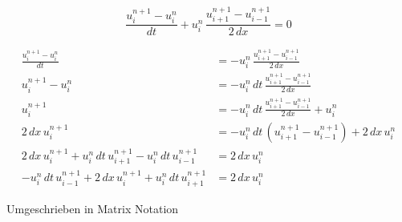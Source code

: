 \begin{equation}
    \frac{u_{i}^{n+1}-u_{i}^{n}}{dt} + u_{i}^{n} \, \frac{u_{i+1}^{n+1} - u_{i-1}^{n+1}}{2 \, dx} = 0
\end{equation}

\begin{subequations}
  \begin{align}
  \frac{u_{i}^{n+1}-u_{i}^{n}}{dt} &= -u_{i}^{n} \, \frac{u_{i+1}^{n+1} - u_{i-1}^{n+1}}{2 \, dx} \\
    u_{i}^{n+1}-u_{i}^{n} &= -u_{i}^{n} \, dt \, \frac{u_{i+1}^{n+1} - u_{i-1}^{n+1}}{2 \, dx}\\
    u_{i}^{n+1} &= -u_{i}^{n} \, dt \, \frac{u_{i+1}^{n+1} - u_{i-1}^{n+1}}{2 \, dx} + u_{i}^{n}\\
    2 \, dx \,  u_{i}^{n+1} &= -u_{i}^{n} \, dt \, \left(u_{i+1}^{n+1} - u_{i-1}^{n+1} \right) + 2 \, dx \, u_{i}^{n}\\
    2 \, dx \,  u_{i}^{n+1} + u_{i}^{n} \, dt \, u_{i+1}^{n+1} -u_{i}^{n} \, dt \, u_{i-1}^{n+1} & =  2 \, dx \, u_{i}^{n}\\
   -u_{i}^{n} \, dt \, u_{i-1}^{n+1} +  2 \, dx \,  u_{i}^{n+1} + u_{i}^{n} \, dt \, u_{i+1}^{n+1} &=  2 \, dx \, u_{i}^{n}
  \end{align}
\end{subequations}



Umgeschrieben in Matrix Notation

